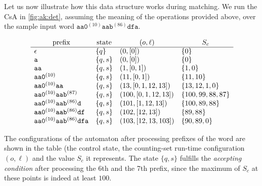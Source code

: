 \documentclass[acmsmall,screen]{acmart}
\begin{document}
Let us now illustrate how this data structure works during matching.
We run the CsA in \cref{fig:ak:det}, assuming the meaning of the
operations provided above, over the sample input word 
$\texttt{aa0}^{(10)}\texttt{aab}^{(86)}\texttt{dfa}$.
\begin{figure}
\vspace*{-5.5mm}
\begin{minipage}{60mm}
{\small
$$
\begin{array}{lllll}
\multicolumn{1}{c}{\text{prefix}} & 
\multicolumn{1}{c}{\text{state}} & 
\multicolumn{1}{c}{(o,\ell)} & 
\multicolumn{1}{c}{S_c} \\ 
\hline
\epsilon                                          &\{q\}  &(0,[0])           & \{0\}\\
\texttt{a}                                        &\{q,s\}&(0,[0])           & \{0\}\\
\texttt{aa}                                       &\{q,s\}&(1,[0,1])         & \{1,0\}\\
\texttt{aa0}^{(10)}                               &\{q,s\}&(11,[0,1])        & \{11,10\}\\
\texttt{aa0}^{(10)}\texttt{aa}                    &\{q,s\}&(13,[0,1,12,13])  & \{13,12,1,0\}\\
\texttt{aa0}^{(10)}\texttt{aab}^{(87)}            &\{q,s\}&(100,[0,1,12,13]) & \{100,99,88,87\}\\
\texttt{aa0}^{(10)}\texttt{aab}^{(86)}\texttt{d}  &\{q,s\}&(101,[1,12,13])   & \{100,89,88\}\\
\texttt{aa0}^{(10)}\texttt{aab}^{(86)}\texttt{df} &\{q,s\}&(102,[12,13])     & \{89,88\}\\
\texttt{aa0}^{(10)}\texttt{aab}^{(86)}\texttt{dfa}&\{q,s\}&(103,[12,13,103]) & \{90,89,0\}
\end{array}
$$
}
\end{minipage}
\end{figure}
The configurations of the automaton after processing prefixes of the word are shown in the table (the control state, the counting-set run-time configuration $(o,\ell)$ and the value $S_c$ it represents.
%
The state $\{q,s\}$ fulfills the \emph{accepting condition} after processing the 6th and the 7th prefix, since the maximum of $S_c$ at these points is indeed at least $100$. 


\vspace{-0.5mm}
\enlargethispage{1mm}
\end{document}
